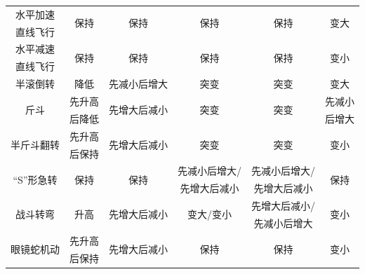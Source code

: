 \documentclass{my_paper}
\begin{document}
\begin{table}[h]
\begin{tabular}{c|ccccc}
水平加速& \multirow{2}{*}{保持} & \multirow{2}{*}{保持}     & \multirow{2}{*}{保持}    & \multirow{2}{*}{保持} & \multirow{2}{*}{变大} \\
 直线飞行                    &                     &                         &                        &                     &                     \\\hline
 水平减速                        & \multirow{2}{*}{保持} & \multirow{2}{*}{保持}     & \multirow{2}{*}{保持}    & \multirow{2}{*}{保持} & \multirow{2}{*}{变小} \\
 直线飞行                    &                     &                         &                        &                     &                     \\\hline
半滚倒转                    & 降低                  & 先减小后增大                  & 突变                     & 突变                  & 变大                  \\\hline
 \multirow{2}{*}{斤斗}     & 先升高                 & \multirow{2}{*}{先增大后减小} & \multirow{2}{*}{突变}    & \multirow{2}{*}{突变} & 先减小                 \\
                         & 后降低                 &                         &                        &                     & 后增大                 \\\hline
 \multirow{2}{*}{半斤斗翻转}  & 先升高                 & \multirow{2}{*}{先增大后减小} & \multirow{2}{*}{突变}    & \multirow{2}{*}{突变} & \multirow{2}{*}{变小} \\
                         & 后保持                 &                         &                        &                     &                     \\\hline
 \multirow{2}{*}{“S”形急转} & \multirow{2}{*}{保持} & \multirow{2}{*}{保持}     & 先减小后增大/                & 先减小后增大/             & \multirow{2}{*}{保持} \\
                         &                     &                         & 先增大后减小                 & 先增大后减小              &                     \\\hline
 \multirow{2}{*}{战斗转弯}   & \multirow{2}{*}{升高} & \multirow{2}{*}{先增大后减小} & \multirow{2}{*}{变大/变小} & 先增大后减小/             & \multirow{2}{*}{变小} \\
                         &                     &                         &                        & 先减小后增大              &                     \\\hline
 \multirow{2}{*}{眼镜蛇机动}  & 先升高                 & \multirow{2}{*}{先增大后减小} & \multirow{2}{*}{保持}    & \multirow{2}{*}{保持} & \multirow{2}{*}{变小} \\
                         & 后保持                 &                         &                        &                     &                    \\
 \hline
                        \end{tabular}
   
    \label{mapping}
\end{table}
\end{document}
